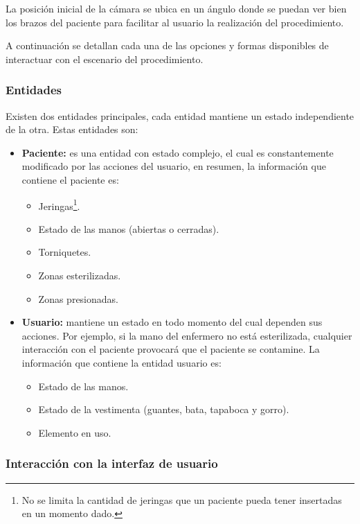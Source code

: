 La posición inicial de la cámara se ubica en un ángulo donde se puedan ver 
bien los brazos del paciente para facilitar al usuario la realización del 
procedimiento.

A continuación se detallan cada una de las opciones y formas disponibles de
interactuar con el escenario del procedimiento.


\subsubsection{Entidades}

Existen dos entidades principales, cada entidad mantiene un estado independiente 
de la otra. Estas entidades son:

\begin{itemize}

\item \textbf{Paciente:} es una entidad con estado complejo, el cual es
    constantemente modificado por las acciones del usuario, en resumen, la
    información que contiene el paciente es:
    \begin{itemize}
        \item Jeringas\footnote{No se limita la cantidad de jeringas que un
                paciente pueda tener insertadas en un momento dado.}.
        \item Estado de las manos (abiertas o cerradas).
        \item Torniquetes.
        \item Zonas esterilizadas.
        \item Zonas presionadas.
    \end{itemize}

\item \textbf{Usuario:} mantiene un estado en todo momento del cual dependen sus
    acciones. Por ejemplo, si la mano del enfermero no está esterilizada,
    cualquier interacción con el paciente provocará que el paciente se
    contamine. La información que contiene la entidad usuario es:

    \begin{itemize}
    \item Estado de las manos.
    \item Estado de la vestimenta (guantes, bata, tapaboca y gorro).
    \item Elemento en uso.
    \end{itemize}
\end{itemize}

\subsubsection{Interacción con la interfaz de usuario}

